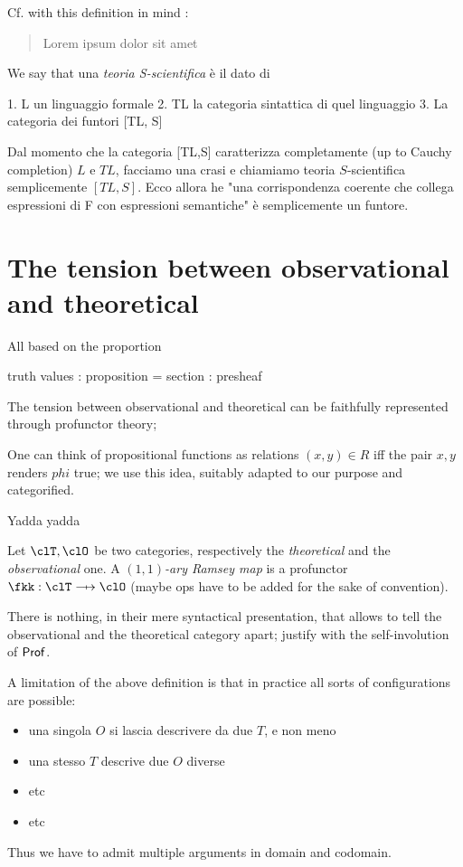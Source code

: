 \documentclass[a4paper]{../birkjour}
\begin{document}
Cf. with this definition in mind \cite{biologia}:
\begin{quote}
  Lorem ipsum dolor sit amet
\end{quote}
We say that una \emph{teoria S-scientifica} è il dato di

1. L un linguaggio formale
2. TL la categoria sintattica di quel linguaggio
3. La categoria dei funtori [TL, S]

Dal momento che la categoria [TL,S] caratterizza completamente (up to Cauchy completion) $L$ e $TL$, facciamo una crasi e chiamiamo teoria $S$-scientifica semplicemente $[TL,S]$. Ecco allora he "una corrispondenza coerente che collega espressioni di F con espressioni semantiche" è semplicemente un funtore.
\section{The tension between observational and theoretical}
\label{sec:orge11c3c4}
All based on the proportion

truth values : proposition = section : presheaf

The tension between observational and theoretical can be faithfully represented through profunctor theory;
\begin{remark}
  One can think of propositional functions as relations $(x,y)\in R$ iff the pair $x,y$ renders $phi$ true; we use this idea, suitably adapted to our purpose and categorified.
\end{remark}
Yadda yadda
\begin{definition}
  Let $\clT,\clO$ be two categories, respectively the \emph{theoretical} and the \emph{observational} one. A \emph{$(1,1)$-ary Ramsey map} is a profunctor $\fkk : \clT \pto \clO$ (maybe ops have to be added for the sake of convention).
\end{definition}
There is nothing, in their mere syntactical presentation, that allows to tell the observational and the theoretical category apart; justify with the self-involution of $\mathsf{Prof}$.

A limitation of the above definition is that in practice all sorts of configurations are possible:
\begin{itemize}
  \item una singola $O$ si lascia descrivere da due $T$, e non meno
  \item una stesso $T$ descrive due $O$ diverse
  \item etc
  \item etc
\end{itemize}
Thus we have to admit multiple arguments in domain and codomain.
\end{document}
